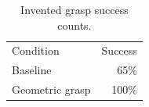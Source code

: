 \begin{table}
\caption{Invented grasp success counts.}
\label{tab:outcomes}
\begin{tabular}{lr}
Condition & Success \\
Baseline & 65\% \\
Geometric grasp & 100\% \\
\end{tabular}
\end{table}
